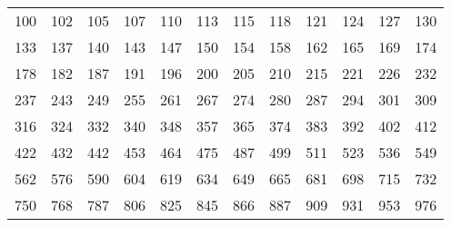 \begin{center}
   \begin{tabular}{cccccccccccc}
   \toprule[1pt]
   100 & 102 & 105 & 107 & 110 & 113 & 115 & 118 & 121 & 124 & 127 & 130 \\
   133 & 137 & 140 & 143 & 147 & 150 & 154 & 158 & 162 & 165 & 169 & 174 \\
   178 & 182 & 187 & 191 & 196 & 200 & 205 & 210 & 215 & 221 & 226 & 232 \\
   237 & 243 & 249 & 255 & 261 & 267 & 274 & 280 & 287 & 294 & 301 & 309 \\
   316 & 324 & 332 & 340 & 348 & 357 & 365 & 374 & 383 & 392 & 402 & 412 \\
   422 & 432 & 442 & 453 & 464 & 475 & 487 & 499 & 511 & 523 & 536 & 549 \\
   562 & 576 & 590 & 604 & 619 & 634 & 649 & 665 & 681 & 698 & 715 & 732 \\
   750 & 768 & 787 & 806 & 825 & 845 & 866 & 887 & 909 & 931 & 953 & 976 \\
   \bottomrule[1pt]
   \end{tabular}
\end{center}
\vspace{5mm}

